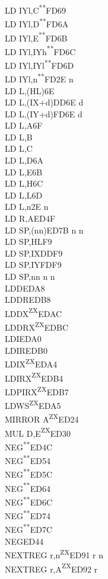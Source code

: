 \documentclass[twoside,openright,a4paper]{book}
\newcommand{\UNDOC}{\textnormal{\textsuperscript{**}}}
\newcommand{\ZXN}{\textnormal{\textsuperscript{ZX}}}
\begin{document}
\begin{multicols}{3}
{\begin{tabbing}
	LD IYl,C\UNDOC\>FD69\\
	LD IYl,D\UNDOC\>FD6A\\
	LD IYl,E\UNDOC\>FD6B\\
	LD IYl,IYh\UNDOC\>FD6C\\
	LD IYl,IYl\UNDOC\>FD6D\\
	LD IYl,n\UNDOC\>FD2E n\\
	LD L,(HL)\>6E\\
	LD L,(IX+d)\>DD6E d\\
	LD L,(IY+d)\>FD6E d\\
	LD L,A\>6F\\
	LD L,B\\
	LD L,C\\
	LD L,D\>6A\\
	LD L,E\>6B\\
	LD L,H\>6C\\
	LD L,L\>6D\\
	LD L,n\>2E n\\
	LD R,A\>ED4F\\
	LD SP,(nn)\>ED7B n n\\
	LD SP,HL\>F9\\
	LD SP,IX\>DDF9\\
	LD SP,IY\>FDF9\\
	LD SP,nn n n\\
	LDD\>EDA8\\
	LDDR\>EDB8\\
	LDDX\ZXN\>EDAC\\
	LDDRX\ZXN\>EDBC\\
	LDI\>EDA0\\
	LDIR\>EDB0\\
	LDIX\ZXN\>EDA4\\
	LDIRX\ZXN\>EDB4\\
	LDPIRX\ZXN\>EDB7\\
	LDWS\ZXN\>EDA5\\
	MIRROR A\ZXN\>ED24\\
	MUL D,E\ZXN\>ED30\\
	NEG\UNDOC\>ED4C\\
	NEG\UNDOC\>ED54\\
	NEG\UNDOC\>ED5C\\
	NEG\UNDOC\>ED64\\
	NEG\UNDOC\>ED6C\\
	NEG\UNDOC\>ED74\\
	NEG\UNDOC\>ED7C\\
	NEG\>ED44\\
	NEXTREG r,n\ZXN\>ED91 r n\\
	NEXTREG r,A\ZXN\>ED92 r\\

\end{tabbing}}
\end{multicols}
\end{document}

